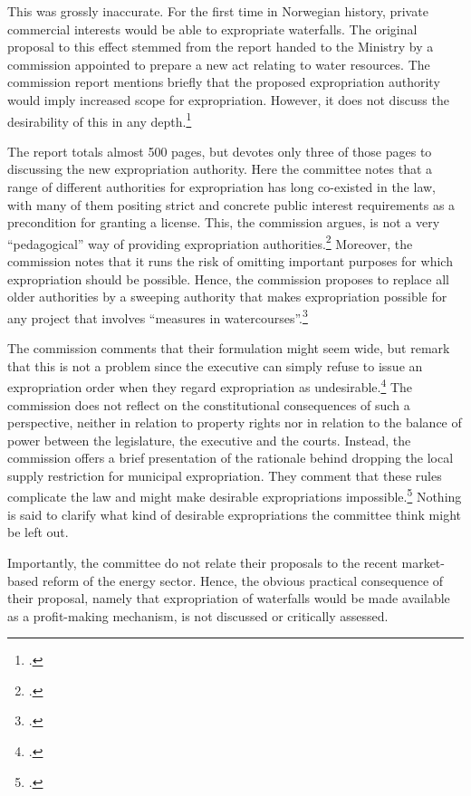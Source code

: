 This was grossly inaccurate. For the first time in Norwegian history, private commercial interests would be able to expropriate waterfalls. The original proposal to this effect stemmed from the report handed to the Ministry by a commission appointed to prepare a new act relating to water resources. The commission report mentions briefly that the proposed expropriation authority would imply increased scope for expropriation. However, it does not discuss the desirability of this in any depth.\footcite[235-237]{nou94} 

The report totals almost 500 pages, but devotes only three of those pages to discussing the new expropriation authority. Here the committee notes that a range of different authorities for expropriation has long co-existed in the law, with many of them positing strict and concrete public interest requirements as a precondition for granting a license. This, the commission argues, is not a very ``pedagogical'' way of providing expropriation authorities.\footcite[235]{nou94} Moreover, the commission notes that it runs the risk of omitting important purposes for which expropriation should be possible. Hence, the commission proposes to replace all older authorities by a sweeping authority that makes expropriation possible for any project that involves ``measures in watercourses''.\footcite[235-236]{nou94}

The commission comments that their formulation might seem wide, but remark that this is not a problem since the executive can simply refuse to issue an expropriation order when they regard expropriation as undesirable.\footcite[235]{nou94} The commission does not reflect on the  constitutional consequences of such a perspective, neither in relation to property rights nor in relation to the balance of power between the legislature, the executive and the courts. Instead, the commission offers a brief presentation of the rationale behind dropping the local supply restriction for municipal expropriation. They comment that these rules complicate the law and might make desirable expropriations impossible.\footcite[235]{nou94} Nothing is said to clarify what kind of desirable expropriations the committee think might be left out. 

Importantly, the committee do not relate their proposals to the recent market-based reform of the energy sector. Hence, the obvious practical consequence of their proposal, namely that expropriation of waterfalls would be made available as a profit-making mechanism, is not discussed or critically assessed.

